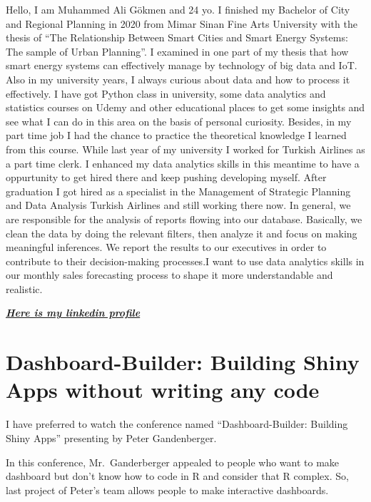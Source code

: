 \documentclass[
  letterpaper,
  DIV=11,
  numbers=noendperiod]{scrreprt}
\begin{document}
Hello, I am Muhammed Ali Gökmen and 24 yo. I finished my Bachelor of
City and Regional Planning in 2020 from Mimar Sinan Fine Arts University
with the thesis of ``The Relationship Between Smart Cities and Smart
Energy Systems: The sample of Urban Planning''. I examined in one part
of my thesis that how smart energy systems can effectively manage by
technology of big data and IoT. Also in my university years, I always
curious about data and how to process it effectively. I have got Python
class in university, some data analytics and statistics courses on Udemy
and other educational places to get some insights and see what I can do
in this area on the basis of personal curiosity. Besides, in my part
time job I had the chance to practice the theoretical knowledge I
learned from this course. While last year of my university I worked for
Turkish Airlines as a part time clerk. I enhanced my data analytics
skills in this meantime to have a oppurtunity to get hired there and
keep pushing developing myself. After graduation I got hired as a
specialist in the Management of Strategic Planning and Data Analysis
Turkish Airlines and still working there now. In general, we are
responsible for the analysis of reports flowing into our database.
Basically, we clean the data by doing the relevant filters, then analyze
it and focus on making meaningful inferences. We report the results to
our executives in order to contribute to their decision-making
processes.I want to use data analytics skills in our monthly sales
forecasting process to shape it more understandable and realistic.

\href{https://www.linkedin.com/in/maligokmen/}{\textbf{\emph{Here is my
linkedin profile}}}

\hypertarget{dashboard-builder-building-shiny-apps-without-writing-any-code}{%
\section{\texorpdfstring{\textbf{Dashboard-Builder: Building Shiny Apps
without writing any
code}}{Dashboard-Builder: Building Shiny Apps without writing any code}}\label{dashboard-builder-building-shiny-apps-without-writing-any-code}}

I have preferred to watch the conference named ``Dashboard-Builder:
Building Shiny Apps'' presenting by Peter Gandenberger.

In this conference, Mr.~Ganderberger appealed to people who want to make
dashboard but don't know how to code in R and consider that R complex.
So, last project of Peter's team allows people to make interactive
dashboards.
\end{document}
